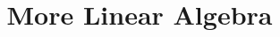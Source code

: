 \documentclass{ximera}
\title{More Linear Algebra}
\begin{document}
  
\begin{abstract}  
\end{abstract}  
\maketitle 
\end{document}

